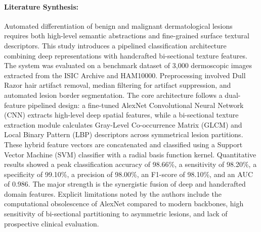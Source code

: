 \paragraph{Literature Synthesis:} Automated differentiation of benign and malignant dermatological lesions requires both high-level semantic abstractions and fine-grained surface textural descriptors. This study introduces a pipelined classification architecture combining deep representations with handcrafted bi-sectional texture features. The system was evaluated on a benchmark dataset of 3,000 dermoscopic images extracted from the ISIC Archive and HAM10000. Preprocessing involved Dull Razor hair artifact removal, median filtering for artifact suppression, and automated lesion border segmentation. The core architecture follows a dual-feature pipelined design: a fine-tuned AlexNet Convolutional Neural Network (CNN) extracts high-level deep spatial features, while a bi-sectional texture extraction module calculates Gray-Level Co-occurrence Matrix (GLCM) and Local Binary Pattern (LBP) descriptors across symmetrical lesion partitions. These hybrid feature vectors are concatenated and classified using a Support Vector Machine (SVM) classifier with a radial basis function kernel. Quantitative results showed a peak classification accuracy of 98.66\%, a sensitivity of 98.20\%, a specificity of 99.10\%, a precision of 98.00\%, an F1-score of 98.10\%, and an AUC of 0.986. The major strength is the synergistic fusion of deep and handcrafted domain features. Explicit limitations noted by the authors include the computational obsolescence of AlexNet compared to modern backbones, high sensitivity of bi-sectional partitioning to asymmetric lesions, and lack of prospective clinical evaluation.

